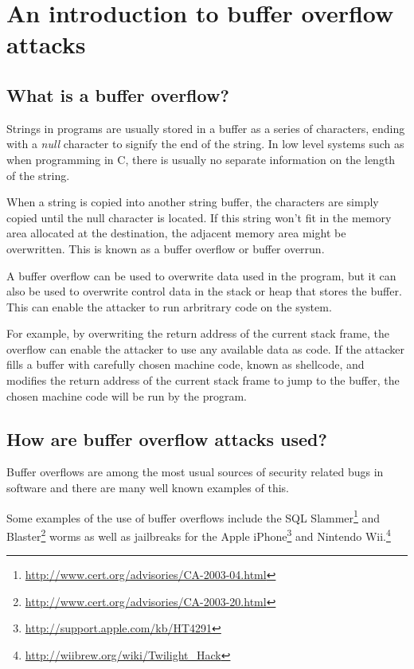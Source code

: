 \section{An introduction to buffer overflow attacks}
\subsection{What is a buffer overflow?}
Strings in programs are usually stored in a buffer as a series of characters,
ending with a \emph{null} character to signify the end of the string.
In low level systems such as when programming in C,
there is usually no separate information on the length of the string.

When a string is copied into another string buffer,
the characters are simply copied until the null character is located.
If this string won't fit in the memory area allocated at the destination,
the adjacent memory area might be overwritten.
This is known as a buffer overflow or buffer overrun.

A buffer overflow can be used to overwrite data used in the program,
but it can also be used to overwrite control data in the stack or heap
that stores the buffer.
This can enable the attacker to run arbritrary code on the system.

For example, by overwriting the return address of the current stack frame,
the overflow can enable the attacker to use any available data as code.
If the attacker fills a buffer with carefully chosen machine code,
known as shellcode,
and modifies the return address of the current stack frame
to jump to the buffer,
the chosen machine code will be run by the program.

\subsection{How are buffer overflow attacks used?}
Buffer overflows are among the most usual sources of
security related bugs in software and
there are many well known examples of this.

Some examples of the use of buffer overflows include the
SQL Slammer\footnote{\url{http://www.cert.org/advisories/CA-2003-04.html}}
and Blaster\footnote{\url{http://www.cert.org/advisories/CA-2003-20.html}}
worms as well as jailbreaks
for the Apple iPhone\footnote{\url{http://support.apple.com/kb/HT4291}}
and Nintendo Wii.\footnote{\url{http://wiibrew.org/wiki/Twilight_Hack}}
